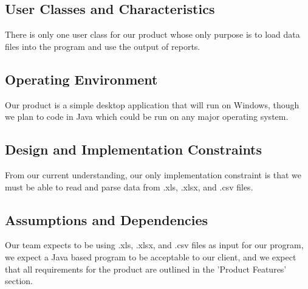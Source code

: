 \subsection{User Classes and Characteristics}
There is only one user class for our product whose only purpose is to load data files into the program and use the output of reports. 

\subsection{Operating Environment}
Our product is a simple desktop application that will run on Windows, though we plan to code in Java which could be run on any major operating system. 

\subsection{Design and Implementation Constraints}
From our current understanding, our only implementation constraint is that we must be able to read and parse data from .xls, .xlsx, and .csv files. 

\subsection{Assumptions and Dependencies}
Our team expects to be using .xls, .xlsx, and .csv files as input for our program, we expect a Java based program to be acceptable to our client, and we expect that all requirements for the product are outlined in the 'Product Features' section.

